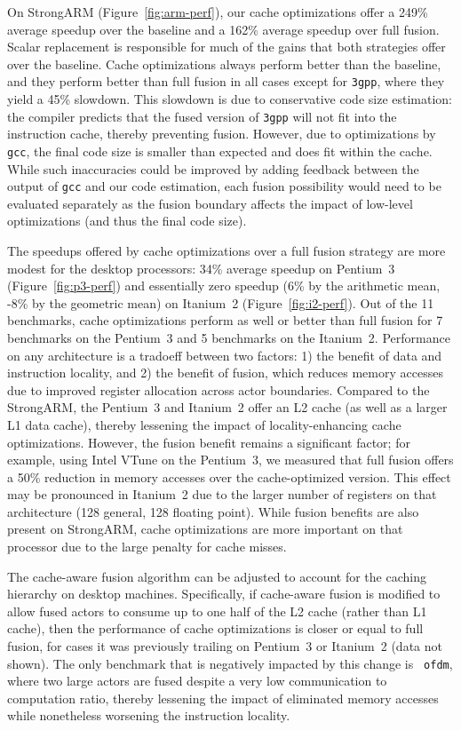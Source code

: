 On StrongARM (Figure~\ref{fig:arm-perf}), our cache optimizations
offer a 249\% average speedup over the baseline and a 162\% average
speedup over full fusion.  Scalar replacement is responsible for much
of the gains that both strategies offer over the baseline.  Cache
optimizations always perform better than the baseline, and they
perform better than full fusion in all cases except for \texttt{3gpp},
where they yield a 45\% slowdown.  This slowdown is due to
conservative code size estimation: the compiler predicts that the
fused version of \texttt{3gpp} will not fit into the instruction
cache, thereby preventing fusion.  However, due to optimizations by
{\tt gcc}, the final code size is smaller than expected and does fit
within the cache.  While such inaccuracies could be improved by adding
feedback between the output of {\tt gcc} and our code estimation, each
fusion possibility would need to be evaluated separately as the fusion
boundary affects the impact of low-level optimizations (and thus the
final code size).

The speedups offered by cache optimizations over a full fusion
strategy are more modest for the desktop processors: 34\% average
speedup on Pentium~3 (Figure~\ref{fig:p3-perf}) and essentially zero
speedup (6\% by the arithmetic mean, -8\% by the geometric mean) on
Itanium~2 (Figure~\ref{fig:i2-perf}).  Out of the 11 benchmarks, cache
optimizations perform as well or better than full fusion for 7
benchmarks on the Pentium~3 and 5 benchmarks on the Itanium~2.
Performance on any architecture is a tradoeff between two factors: 1)
the benefit of data and instruction locality, and 2) the benefit of
fusion, which reduces memory accesses due to improved register
allocation across actor boundaries.  Compared to the StrongARM, the
Pentium~3 and Itanium~2 offer an L2 cache (as well as a larger L1 data
cache), thereby lessening the impact of locality-enhancing cache
optimizations.  However, the fusion benefit remains a significant
factor; for example, using Intel VTune on the Pentium~3, we measured
that full fusion offers a 50\% reduction in memory accesses over the
cache-optimized version.  This effect may be pronounced in Itanium~2
due to the larger number of registers on that architecture (128
general, 128 floating point).  While fusion benefits are also present
on StrongARM, cache optimizations are more important on that processor
due to the large penalty for cache misses.

The cache-aware fusion algorithm can be adjusted to account for the
caching hierarchy on desktop machines.  Specifically, if cache-aware
fusion is modified to allow fused actors to consume up to one half of
the L2 cache (rather than L1 cache), then the performance of cache
optimizations is closer or equal to full fusion, for cases it was
previously trailing on Pentium~3 or Itanium~2 (data not shown).  The
only benchmark that is negatively impacted by this change is {\tt
ofdm}, where two large actors are fused despite a very low
communication to computation ratio, thereby lessening the impact of
eliminated memory accesses while nonetheless worsening the instruction
locality.

